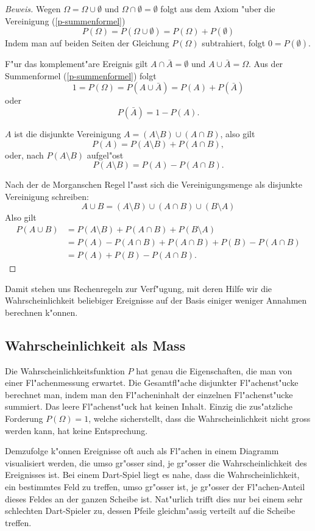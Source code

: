 \begin{proof}[Beweis]
Wegen $\Omega = \Omega \cup\emptyset$ und
$\Omega\cap\emptyset = \emptyset$ folgt aus dem Axiom
"uber die Vereinigung  (\ref{p-summenformel})
\[
P(\Omega) = P(\Omega \cup \emptyset) = P(\Omega) + P(\emptyset)
\]
Indem man auf beiden Seiten der Gleichung $P(\Omega)$ subtrahiert,
folgt $0 = P(\emptyset)$.

F"ur das komplement"are Ereignis gilt $A\cap\bar A=\emptyset$ und
$A\cup\bar A=\Omega$.
Aus der Summenformel (\ref{p-summenformel}) folgt
\[
1 = P(\Omega) = P(A\cup\bar A) = P(A) + P(\bar A)
\]
oder
\[
P(\bar A) = 1 - P(A).
\]

$A$ ist die disjunkte Vereinigung $A=(A\setminus B) \cup (A\cap B)$,
also gilt
\[
P(A)=P(A\setminus B) + P(A\cap B),
\]
oder, nach $P(A\setminus B)$ aufgel"ost
\[
P(A\setminus B) = P(A) - P(A\cap B).
\]

Nach der de Morganschen Regel l"asst sich die Vereinigungsmenge
als disjunkte Vereinigung schreiben:
\[
A\cup B =  (A\setminus B) \cup (A\cap B) \cup (B\setminus A)
\]
Also gilt
\begin{align*}
P(A\cup B)&=P(A\setminus B) + P(A\cap B) + P(B\setminus A)\\
&=P(A) - P(A\cap B) + P(A\cap B) + P(B) - P(A\cap B)\\
&=P(A) + P(B) - P(A\cap B).
\end{align*}
\end{proof}
Damit stehen uns Rechenregeln zur Verf"ugung, mit deren Hilfe wir
die Wahrscheinlichkeit beliebiger Ereignisse auf der Basis einiger
weniger Annahmen berechnen k"onnen.

\subsection{Wahrscheinlichkeit als Mass}
Die Wahrscheinlichkeitsfunktion $P$ hat genau die Eigenschaften,
die man von einer Fl"achenmessung erwartet.
Die Gesamtfl"ache disjunkter Fl"achenst"ucke berechnet man,
indem man den Fl"acheninhalt der einzelnen Fl"achenst"ucke summiert.
Das leere Fl"achenst"uck hat keinen Inhalt.
Einzig die zus"atzliche Forderung $P(\Omega)=1$, welche
sicherstellt, dass die Wahrscheinlichkeit nicht gross werden kann,
hat keine Entsprechung.

Demzufolge k"onnen Ereignisse oft auch als Fl"achen in einem Diagramm
visualisiert werden,
die umso gr"osser sind, je gr"osser die Wahrscheinlichkeit des Ereignisses
ist.
Bei einem Dart-Spiel liegt es nahe, dass die Wahrscheinlichkeit, ein
bestimmtes Feld zu treffen, umso gr"osser ist, je gr"osser der Fl"achen-Anteil
dieses Feldes an der ganzen Scheibe ist.
Nat"urlich trifft dies nur bei einem
sehr schlechten Dart-Spieler zu, dessen Pfeile gleichm"assig verteilt auf
die Scheibe treffen.


